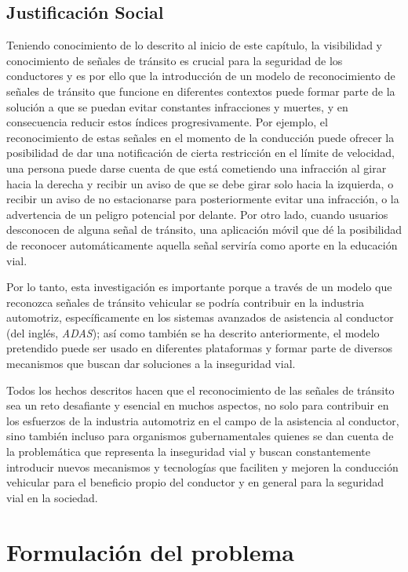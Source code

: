 	\subsection{Justificación Social}
	
	Teniendo conocimiento de lo descrito al inicio de este capítulo, la visibilidad y conocimiento de señales de tránsito es crucial para la seguridad de los conductores y es por ello que la introducción de un modelo de reconocimiento de señales de tránsito que funcione en diferentes contextos puede formar parte de la solución a que se puedan evitar constantes infracciones y muertes, y en consecuencia reducir estos índices progresivamente. Por ejemplo, el reconocimiento de estas señales en el momento de la conducción puede ofrecer la posibilidad de dar una notificación de cierta restricción en el límite de velocidad, una persona puede darse cuenta de que está cometiendo una infracción al girar hacia la derecha y recibir un aviso de que se debe girar solo hacia la izquierda, o recibir un aviso de no estacionarse para posteriormente evitar una infracción, o la advertencia de un peligro potencial por delante. Por otro lado, cuando usuarios desconocen de alguna señal de tránsito, una aplicación móvil que dé la posibilidad de reconocer automáticamente aquella señal serviría como aporte en la educación vial.\vskip 0.2cm

	Por lo tanto, esta investigación es importante porque a través de un modelo que reconozca señales de tránsito vehicular se podría contribuir en la industria automotriz, específicamente en los sistemas avanzados de asistencia al conductor (del inglés, \textit{ADAS}); así como también se ha descrito anteriormente, el modelo pretendido puede ser usado en diferentes plataformas y formar parte de diversos mecanismos que buscan dar soluciones a la inseguridad vial. \vskip 0.2cm
	
	Todos los hechos descritos hacen que el reconocimiento de las señales de tránsito sea un reto desafiante y esencial en muchos aspectos, no solo para contribuir en los esfuerzos de la industria automotriz en el campo de la asistencia al conductor, sino también incluso para organismos gubernamentales quienes se dan cuenta de la problemática que representa la inseguridad vial y buscan constantemente introducir nuevos mecanismos y tecnologías que faciliten y mejoren la conducción vehicular para el beneficio propio del conductor y en general para la seguridad vial en la sociedad.


\section{Formulación del problema}

